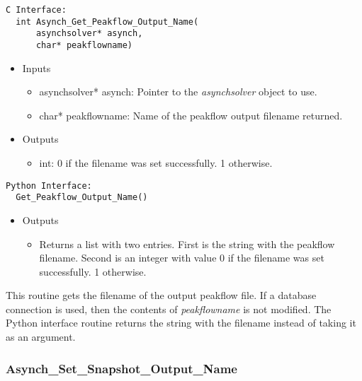 \documentclass[12pt]{article}
\begin{document}
\begin{lstlisting}[style=CStyle]
  C Interface:
  int Asynch_Get_Peakflow_Output_Name(
      asynchsolver* asynch,
      char* peakflowname)
\end{lstlisting}
\begin{itemize}
 \item Inputs
  \begin{itemize}
   \item asynchsolver* asynch: Pointer to the \emph{asynchsolver} object to use.
   \item char* peakflowname: Name of the peakflow output filename returned.
  \end{itemize}
 \item Outputs
  \begin{itemize}
   \item int: 0 if the filename was set successfully. 1 otherwise.
  \end{itemize}
\end{itemize}
\begin{lstlisting}[style=PythonStyle]
  Python Interface:
  Get_Peakflow_Output_Name()
\end{lstlisting}
\begin{itemize}
 \item Outputs
  \begin{itemize}
   \item Returns a list with two entries. First is the string with the peakflow filename. Second is an integer with value 0 if the filename was set successfully. 1 otherwise.
  \end{itemize}
\end{itemize}
This routine gets the filename of the output peakflow file. If a database connection is used, then the contents of \emph{peakflowname} is not modified. The Python interface routine returns the string with the filename instead of taking it as an argument.


\subsubsection{Asynch\_Set\_Snapshot\_Output\_Name} \label{sec: asynch_set_snapshot_output_name}
\end{document}
